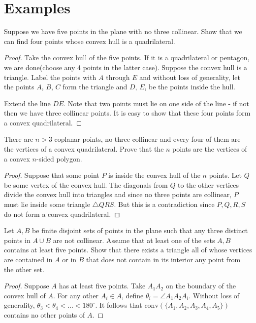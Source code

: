 \documentclass[11pt]{scrartcl}
\begin{document}
\section{Examples}
\begin{prob} Suppose we have five points in the plane with no three collinear.  Show that we can find four points whose convex hull is a quadrilateral.
\end{prob}
\begin{proof}
Take the convex hull of the five points.  If it is a quadrilateral or pentagon, we are done(choose any 4 points in the latter case).  Suppose the convex hull is a triangle.  Label the points with $A$ through $E$ and without loss of generality, let the points $A$, $B$, $C$ form the triangle and $D$, $E$, be the points inside the hull.

Extend the line $DE$.  Note that two points must lie on one side of the line - if not then we have three collinear points.  It is easy to show that these four points form a convex quadrilateral. 
\end{proof}
\begin{prob} There are $n > 3$ coplanar points, no three collinear and every four of them are the vertices of a convex quadrilateral.  Prove that the $n$ points are the vertices of a convex $n$-sided polygon.
\end{prob}
\begin{proof}
Suppose that some point $P$ is inside the convex hull of the $n$ points.  Let $Q$ be some vertex of the convex hull.  The diagonals from $Q$ to the other vertices divide the convex hull into triangles and since no three points are collinear, $P$ must lie inside some triangle $\triangle QRS$.  But this is a contradiction since $P, Q, R, S$ do not form a convex quadrilateral.
\end{proof}

\begin{prob} Let $A, B$ be finite disjoint sets of points in the plane such that any three distinct points in $A \cup B$ are not collinear.  Assume that at least one of the sets $A, B$ contains at least five points.  Show that there exists a triangle all of whose vertices are contained in $A$ or in $B$ that does not contain in its interior any point from the other set.
\end{prob}
\begin{proof}
Suppose $A$ has at least five points.  Take $A_1A_2$ on the boundary of the convex hull of $A$.  For any other $A_i \in A$, define $\theta_i = \angle A_1A_2A_i$.  Without loss of generality, $\theta_3 < \theta_4 < \dots < 180^\circ$.  It follows that $\text{conv}(\{A_1, A_2, A_3, A_4, A_5\})$ contains no other points of $A$.
\end{proof}
\pagebreak
\end{document}
